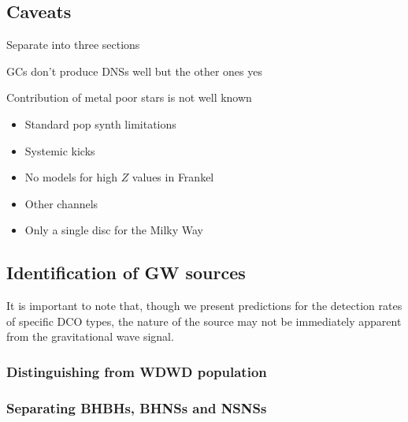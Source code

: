 \subsection{Caveats}
Separate into three sections

GCs don't produce DNSs well but the other ones yes

Contribution of metal poor stars is not well known

\begin{itemize}
    \item Standard pop synth limitations
    \item Systemic kicks
    \item No models for high $Z$ values in Frankel
    \item Other channels
    \item Only a single disc for the Milky Way
\end{itemize}

\subsection{Identification of GW sources}
It is important to note that, though we present predictions for the detection rates of specific DCO types, the nature of the source may not be immediately apparent from the gravitational wave signal.

\subsubsection{Distinguishing from WDWD population}
\subsubsection{Separating BHBHs, BHNSs and NSNSs}